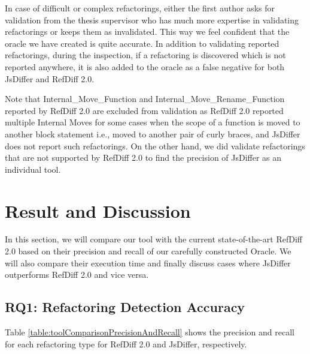 \documentclass[letterpaper,12pt,onecolumn,final]{report}
\begin{document}
In case of difficult or complex refactorings, either the first author asks for validation from the thesis supervisor who has much more expertise in validating refactorings or keeps them as invalidated. This way we feel confident that the oracle we have created is quite accurate. In addition to validating reported refactorings, during the inspection, if a refactoring is discovered which is not reported anywhere, it is also added to the oracle as a false negative for both JsDiffer and RefDiff 2.0. 

Note that Internal\_Move\_Function and Internal\_Move\_Rename\_Function reported by RefDiff 2.0 are excluded from validation as RefDiff 2.0 reported multiple Internal Moves for some cases when the scope of a function is moved to another block statement i.e., moved to another pair of curly braces, and JsDiffer does not report such refactorings. On the other hand, we did validate refactorings that are not supported by RefDiff 2.0 to find the precision of JsDiffer as an individual tool.

\section {Result and Discussion}

In this section, we will compare our tool with the current state-of-the-art RefDiff 2.0 based on their precision and recall of our carefully constructed Oracle. We will also compare their execution time and finally discuss cases where JsDiffer outperforms RefDiff 2.0 and vice versa.

\subsection{RQ1: Refactoring Detection Accuracy}

Table \ref{table:toolComparisonPrecisionAndRecall} shows the precision and recall for each refactoring type for RefDiff 2.0 and JsDiffer, respectively. 
\end{document}
